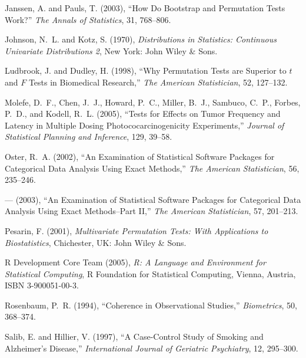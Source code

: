 \documentclass{article}
\begin{document}
\begin{thebibliography}{22}
Janssen, A. and Pauls, T. (2003), \enquote{How Do Bootstrap and Permutation
  Tests Work?} \textit{The Annals of Statistics}, 31, 768--806.

Johnson, N.~L. and Kotz, S. (1970), \textit{Distributions in Statistics:
  Continuous Univariate Distributions 2}, New York: John Wiley \& Sons.

Ludbrook, J. and Dudley, H. (1998), \enquote{Why Permutation Tests are Superior
  to $t$ and {$F$} Tests in Biomedical Research,} \textit{The American
  Statistician}, 52, 127--132.

Molefe, D.~F., Chen, J.~J., Howard, P.~C., Miller, B.~J., Sambuco, C.~P.,
  Forbes, P.~D., and Kodell, R.~L. (2005), \enquote{Tests for Effects on Tumor
  Frequency and Latency in Multiple Dosing Photococarcinogenicity Experiments,}
  \textit{Journal of Statistical Planning and Inference}, 129, 39--58.

Oster, R.~A. (2002), \enquote{An Examination of Statistical Software Packages
  for Categorical Data Analysis Using Exact Methods,} \textit{The American
  Statistician}, 56, 235--246.

--- (2003), \enquote{An Examination of Statistical Software Packages for
  Categorical Data Analysis Using Exact Methods--{P}art II,} \textit{The
  American Statistician}, 57, 201--213.

Pesarin, F. (2001), \textit{Multivariate Permutation Tests: With Applications
  to Biostatistics}, Chichester, UK: John Wiley \& Sons.

{R Development Core Team} (2005), \textit{\textsf{R}: A Language and
  Environment for Statistical Computing}, R Foundation for Statistical
  Computing, Vienna, Austria, {ISBN} 3-900051-00-3.

Rosenbaum, P.~R. (1994), \enquote{Coherence in Observational Studies,}
  \textit{Biometrics}, 50, 368--374.

Salib, E. and Hillier, V. (1997), \enquote{A Case-Control Study of Smoking and
  Alzheimer's Disease,} \textit{International Journal of Geriatric Psychiatry},
  12, 295--300.


\end{thebibliography}
\end{document}
